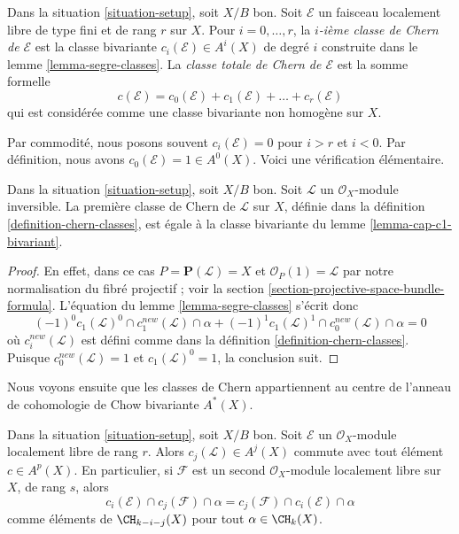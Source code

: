 \begin{definition}
\label{definition-chern-classes}
Dans la situation \ref{situation-setup}, soit $X/B$ bon. Soit $\mathcal{E}$ un
faisceau localement libre de type fini et de rang $r$ sur $X$. Pour $i = 0,
\ldots, r$, la {\it $i$-ième classe de Chern de $\mathcal{E}$} est la classe
bivariante $c_i(\mathcal{E}) \in A^i(X)$ de degré $i$ construite dans le lemme
\ref{lemma-segre-classes}. La {\it classe totale de Chern de $\mathcal{E}$} est
la somme formelle
$$
c(\mathcal{E}) =
c_0(\mathcal{E}) + c_1(\mathcal{E}) + \ldots + c_r(\mathcal{E})
$$
qui est considérée comme une classe bivariante non homogène sur $X$.
\end{definition}

\noindent
Par commodité, nous posons souvent $c_i(\mathcal{E}) = 0$ pour
$i > r$ et $i < 0$. Par définition, nous avons $c_0(\mathcal{E}) = 1 \in
A^0(X)$. Voici une vérification élémentaire.

\begin{lemma}
\label{lemma-first-chern-class}
Dans la situation \ref{situation-setup}, soit $X/B$ bon. Soit $\mathcal{L}$ un
$\mathcal{O}_X$-module inversible. La première classe de Chern de
$\mathcal{L}$ sur $X$, définie dans la définition
\ref{definition-chern-classes}, est égale à la classe bivariante du lemme
\ref{lemma-cap-c1-bivariant}.
\end{lemma}

\begin{proof}
En effet, dans ce cas $P = \mathbf{P}(\mathcal{L}) = X$ et $\mathcal{O}_P(1) =
\mathcal{L}$ par notre normalisation du fibré projectif ; voir la section
\ref{section-projective-space-bundle-formula}. L'équation du lemme
\ref{lemma-segre-classes} s'écrit donc
$$
(-1)^0 c_1(\mathcal{L})^0 \cap c^{new}_1(\mathcal{L}) \cap \alpha +
(-1)^1 c_1(\mathcal{L})^1 \cap c^{new}_0(\mathcal{L}) \cap \alpha = 0
$$
où $c_i^{new}(\mathcal{L})$ est défini comme dans la définition
\ref{definition-chern-classes}. Puisque $c_0^{new}(\mathcal{L}) = 1$ et
$c_1(\mathcal{L})^0 = 1$, la conclusion suit.
\end{proof}

\noindent
Nous voyons ensuite que les classes de Chern appartiennent au centre de
l'anneau de cohomologie de Chow bivariante $A^*(X)$.

\begin{lemma}
\label{lemma-cap-commutative-chern}
Dans la situation \ref{situation-setup}, soit $X/B$ bon. Soit $\mathcal{E}$ un
$\mathcal{O}_X$-module localement libre de rang $r$. Alors
$c_j(\mathcal{L}) \in A^j(X)$ commute avec tout élément $c \in A^p(X)$. En
particulier, si $\mathcal{F}$ est un second $\mathcal{O}_X$-module localement
libre sur $X$, de rang $s$, alors
$$
c_i(\mathcal{E}) \cap c_j(\mathcal{F}) \cap \alpha
=
c_j(\mathcal{F}) \cap c_i(\mathcal{E}) \cap \alpha
$$
comme éléments de $\CH_{k - i - j}(X)$ pour tout $\alpha \in \CH_k(X)$.
\end{lemma}

